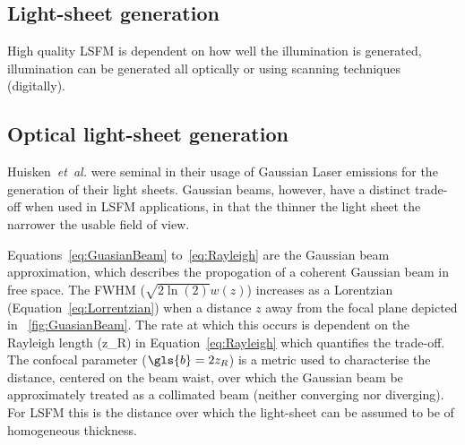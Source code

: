 


%

\subsection{Light-sheet generation}

High quality \gls{LSFM} is dependent on how well the illumination is generated, illumination can be generated all optically or using scanning techniques (digitally).

\subsection{Optical \gls{light-sheet} generation}


Huisken~\emph{et~al.} were seminal in their usage of Gaussian \gls{Laser} emissions for the generation of their light sheets.
\gls{Gaussian beam}s, however, have a distinct trade-off when used in LSFM applications, in that the thinner the light sheet the narrower the usable field of view.

Equations~\eqref{eq:GuasianBeam} to~\eqref{eq:Rayleigh} are the Gaussian beam approximation, which describes the propogation of a coherent Gaussian beam in free space.
The \gls{FWHM} (\(\sqrt{2\ln(2)}w(z)\)) %
increases as a \gls{Lorentzian} (Equation~\eqref{eq:Lorrentzian}) when a distance \(z\) away from the focal plane depicted in \figurename~\ref{fig:GuasianBeam}.
The rate at which this occurs is dependent on the \gls{Rayleigh length} (\gls{z_R}) in Equation~\eqref{eq:Rayleigh} which quantifies the trade-off.
The confocal parameter (\(\gls{b}=2z_R\)) is a metric used to characterise the distance, centered on the beam waist, over which the Gaussian beam be approximately treated as a collimated beam (neither converging nor diverging).
For \gls{LSFM} this is the distance over which the \gls{light-sheet} can be assumed to be of homogeneous thickness.

